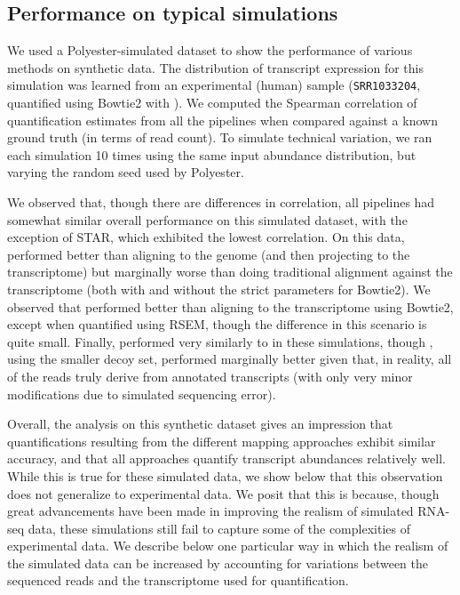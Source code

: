 \subsection{Performance on typical simulations}
\label{subsec:initial_sim}

We used a Polyester\cite{polyester}-simulated dataset to show the performance
of various methods on synthetic data. The distribution of transcript
expression for this simulation was learned from an experimental (human) sample
(\texttt{SRR1033204}, quantified using Bowtie2 with \salmon). We computed the
Spearman correlation of quantification estimates from all the pipelines when
compared against a known ground truth (in terms of read count). To simulate
technical variation, we ran each simulation 10 times using the same input
abundance distribution, but varying the random seed used by Polyester.

We observed that, though there are differences in correlation, all pipelines had
somewhat similar overall performance on this simulated dataset, with the
exception of STAR, which exhibited the lowest correlation. On this data, \qm
performed better than aligning to the genome (and then projecting to the
transcriptome) but marginally worse than doing traditional alignment
against the transcriptome (both with and without the strict parameters for
Bowtie2). We observed that \hsa performed better than aligning to
the transcriptome using Bowtie2, except when quantified using RSEM, though the
difference in this scenario is quite small. Finally, \saf performed very similarly
to \hsa in these simulations, though \hsa, using the smaller decoy set, performed marginally
better given that, in reality, all of the reads truly derive from annotated transcripts (with 
only very minor modifications due to simulated sequencing error).

Overall, the analysis on this synthetic dataset gives an impression that
quantifications resulting from the different mapping approaches exhibit similar
accuracy, and that all approaches quantify transcript abundances relatively
well. While this is true for these simulated data, we show below that this
observation does not generalize to experimental data. We posit that this is
because, though great advancements have been made in improving the realism of
simulated RNA-seq data, these simulations still fail to capture some of the
complexities of experimental data. We describe below one particular way in which
the realism of the simulated data can be increased by accounting for variations
between the sequenced reads and the transcriptome used for quantification.

